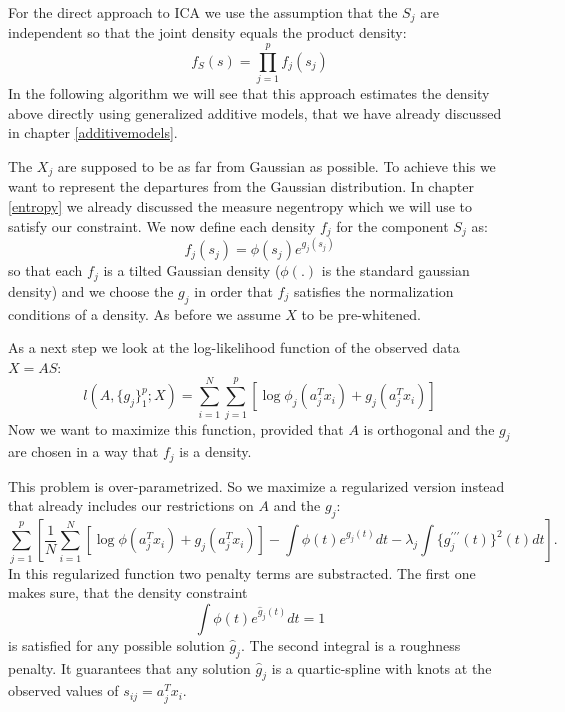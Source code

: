 \documentclass[12pt, a4paper]{article}
\numberwithin{equation}{section}
\numberwithin{figure}{section}
\numberwithin{table}{section}
\begin{document}
	For the direct approach to ICA we use the assumption that the \mbox{$S_j$} are independent so that the joint density equals the product density:
	\begin{equation}
	f_S(s)=\prod_{j=1}^{p}f_j(s_j)
	\end{equation}
	In the following algorithm we will see that this approach estimates the density above directly using generalized additive models, that we have already discussed in chapter \ref{additivemodels}.
	
	The \mbox{$X_j$} are supposed to be as far from Gaussian as possible.
	To achieve this we want to represent the departures from the Gaussian distribution. 
	In chapter \ref{entropy} we already discussed the measure negentropy which we will use to satisfy our constraint.
	We now define each density \mbox{$f_j$} for the component \mbox{$S_j$} as:
	\begin{equation}\label{tilted-gaussian}
	f_j(s_j)=\phi (s_j)e^{g_j(s_j)}
	\end{equation}
	so that each \mbox{$f_j$} is a tilted Gaussian density (\mbox{$\phi(.)$} is the standard gaussian density) and we choose the \mbox{$g_j$} in order that \mbox{$f_j$} satisfies the normalization conditions of a density. %
	As before we assume $X$ to be pre-whitened.
	
	As a next step we look at the log-likelihood function of the observed data \mbox{$X=AS$}:
	\begin{equation}
	l(A,\{g_j\}_1^p;X)=\sum_{i=1}^N \sum_{j=1}^p [\log \phi_j (a_j^T x_i) + g_j(a_j^Tx_i)]
	\end{equation}
	Now we want to maximize this function, provided that $A$ is orthogonal and the \mbox{$g_j$} are chosen in a way that \mbox{$f_j$} is a density.
	
	This problem is over-parametrized. So we maximize a regularized version instead that already includes our restrictions on $A$ and the \mbox{$g_j$}:
	\begin{equation}
	\sum_{j=1}^p[\frac{1}{N}\sum_{i=1}^N[\log\phi(a_j^Tx_i)+g_j(a_j^Tx_i)]-\int\phi(t)e^{g_j(t)}dt-\lambda_j\int\{g_j^{\prime\prime\prime}(t)\}^2(t)dt].
	\end{equation}
	In this regularized function two penalty terms are substracted. The first one makes sure, that the density constraint
	\begin{equation}
	\int \phi (t)e^{\hat{g}_j(t)}dt = 1
	\end{equation}
	is satisfied for any possible solution \mbox{$\hat{g}_j$}.
	The second integral is a roughness penalty. It guarantees that any solution \mbox{$\hat{g}_j$} is a quartic-spline with knots at the observed values of \mbox{$s_{ij}=a_j^Tx_i$}. %
	
\end{document}
